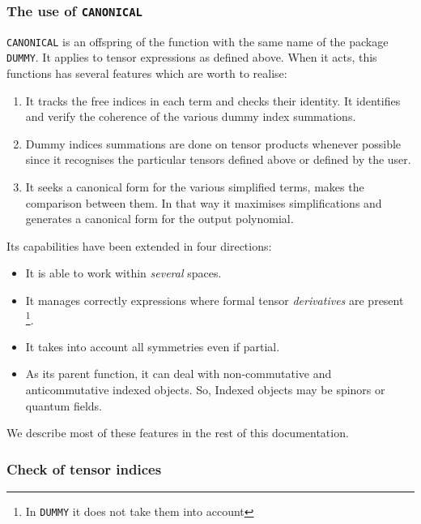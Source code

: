 \subsubsection{The use of \texttt{CANONICAL}}

\texttt{CANONICAL}  is an offspring of the function 
with the same name of the package \texttt{DUMMY}. 
It applies to tensor expressions as defined above.   
When it acts, this functions has several features which are 
worth to realise:
\begin{enumerate}
\item It tracks the free indices in each term  and checks their
identity.  It identifies and verify the coherence 
of the various dummy index summations.
\item Dummy indices summations are done on tensor products whenever 
possible since it recognises the particular tensors 
defined above or defined by the user.
\item It seeks a canonical form for the 
various simplified terms, makes the comparison between them.
In that way it maximises simplifications and generates a canonical form 
for the output polynomial.  
\end{enumerate}
Its capabilities  have been extended in four directions:
\begin{itemize}
\item It is able to work within \emph{several} spaces.
\item It manages correctly expressions where 
formal tensor \emph{derivatives} are present%
\footnote{In \texttt{DUMMY} it does not take them into account}. 
\item It takes into account all symmetries even if partial.
\item As its parent function, it can deal with non-commutative 
and anticommutative indexed objects.
So, Indexed objects may be spinors or quantum fields.
\end{itemize}
We describe most of these features in the rest of this 
documentation.
\subsubsection{Check of tensor indices}

